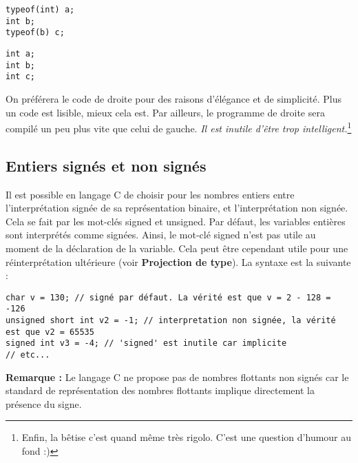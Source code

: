 \documentclass[../../../main.tex]{subfiles}
\begin{document}
\begin{minipage}{0.5\textwidth}
\begin{verbatim}
typeof(int) a;
int b;
typeof(b) c;
\end{verbatim}
\end{minipage}
\begin{minipage}{0.5\textwidth}
\begin{verbatim}
int a;
int b;
int c;
\end{verbatim}
\end{minipage}

On préférera le code de droite pour des raisons d'élégance et de simplicité. Plus un code est lisible, mieux cela est. Par ailleurs, le programme de droite sera compilé un peu plus vite que celui de gauche. \textit{Il est inutile d'être trop intelligent.}\footnote{Enfin, la bêtise c'est quand même très rigolo. C'est une question d'humour au fond :)}
\subsection{Entiers signés et non signés}
Il est possible en langage C de choisir pour les nombres entiers entre l'interprétation signée de sa représentation binaire, et l'interprétation non signée. Cela se fait par les mot-clés \textsf{signed} et \textsf{unsigned}. Par défaut, les variables entières sont interprétés comme signées. Ainsi, le mot-clé \textsf{signed} n'est pas utile au moment de la déclaration de la variable. Cela peut être cependant utile pour une réinterprétation ultérieure (voir \textbf{Projection de type}). La syntaxe est la suivante :
\begin{verbatim}
char v = 130; // signé par défaut. La vérité est que v = 2 - 128 = -126
unsigned short int v2 = -1; // interpretation non signée, la vérité est que v2 = 65535
signed int v3 = -4; // 'signed' est inutile car implicite
// etc...
\end{verbatim}
\textbf{Remarque :} Le langage C ne propose pas de nombres flottants non signés car le standard de représentation des nombres flottants implique directement la présence du signe.
\end{document}

